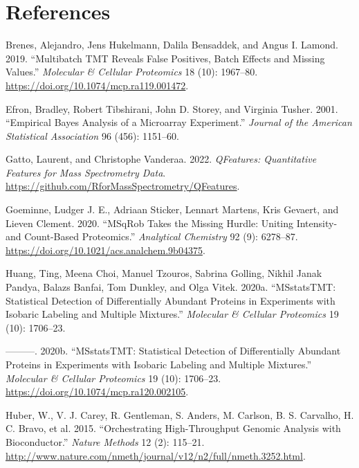 \documentclass[
  letterpaper,
  DIV=11,
  numbers=noendperiod]{scrartcl}
\newlength{\cslhangindent}
\newenvironment{CSLReferences}[2] %
 {\begin{list}{}{%
  \setlength{\itemindent}{0pt}
  \setlength{\leftmargin}{0pt}
  \setlength{\parsep}{0pt}
  \ifodd #1
   \setlength{\leftmargin}{\cslhangindent}
   \setlength{\itemindent}{-1\cslhangindent}
  \fi
  \setlength{\itemsep}{#2\baselineskip}}}
 {\end{list}}
\begin{document}
\section{References}

\label{refs}
\begin{CSLReferences}{1}{0}
Brenes, Alejandro, Jens Hukelmann, Dalila Bensaddek, and Angus I.
Lamond. 2019. {``Multibatch {TMT} Reveals False Positives, Batch Effects
and Missing Values.''} \emph{Molecular \& Cellular Proteomics} 18 (10):
1967--80. \url{https://doi.org/10.1074/mcp.ra119.001472}.

Efron, Bradley, Robert Tibshirani, John D. Storey, and Virginia Tusher.
2001. {``Empirical {Bayes} Analysis of a Microarray Experiment.''}
\emph{Journal of the American Statistical Association} 96 (456):
1151--60.

Gatto, Laurent, and Christophe Vanderaa. 2022. \emph{QFeatures:
Quantitative Features for Mass Spectrometry Data}.
\url{https://github.com/RforMassSpectrometry/QFeatures}.

Goeminne, Ludger J. E., Adriaan Sticker, Lennart Martens, Kris Gevaert,
and Lieven Clement. 2020. {``{MSqRob} Takes the Missing Hurdle: Uniting
Intensity- and Count-Based Proteomics.''} \emph{Analytical Chemistry} 92
(9): 6278--87. \url{https://doi.org/10.1021/acs.analchem.9b04375}.

Huang, Ting, Meena Choi, Manuel Tzouros, Sabrina Golling, Nikhil Janak
Pandya, Balazs Banfai, Tom Dunkley, and Olga Vitek. 2020a.
{``MSstatsTMT: Statistical Detection of Differentially Abundant Proteins
in Experiments with Isobaric Labeling and Multiple Mixtures.''}
\emph{Molecular \& Cellular Proteomics} 19 (10): 1706--23.

---------. 2020b. {``{MSstatsTMT}: Statistical Detection of
Differentially Abundant Proteins in Experiments with Isobaric Labeling
and Multiple Mixtures.''} \emph{Molecular \& Cellular Proteomics} 19
(10): 1706--23. \url{https://doi.org/10.1074/mcp.ra120.002105}.

Huber, W., V. J. Carey, R. Gentleman, S. Anders, M. Carlson, B. S.
Carvalho, H. C. Bravo, et al. 2015. {``{O}rchestrating High-Throughput
Genomic Analysis with {B}ioconductor.''} \emph{Nature Methods} 12 (2):
115--21.
\url{http://www.nature.com/nmeth/journal/v12/n2/full/nmeth.3252.html}.


\end{CSLReferences}
\end{document}
